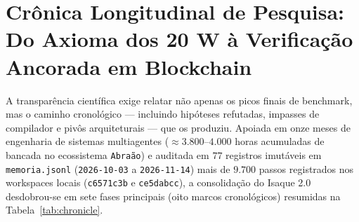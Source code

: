 \documentclass[10pt,a4paper]{article}
\begin{document}
\section{Cr\^onica Longitudinal de Pesquisa: Do Axioma dos 20 W \`a Verifica\c{c}\~ao Ancorada em Blockchain}

A transpar\^encia cient\'ifica exige relatar n\~ao apenas os picos finais de benchmark, mas o caminho cronol\'ogico --- incluindo hip\'oteses refutadas, impasses de compilador e piv\^os arquiteturais --- que os produziu. Apoiada em onze meses de engenharia de sistemas multiagentes ($\approx 3.800\text{--}4.000$ horas acumuladas de bancada no ecossistema \texttt{Abra\~ao}) e auditada em $77$ registros imut\'aveis em \texttt{memoria.jsonl} (\texttt{2026-10-03} a \texttt{2026-11-14}) mais de $9.700$ passos registrados nos workspaces locais (\texttt{c6571c3b} e \texttt{ce5dabcc}), a consolida\c{c}\~ao do Isaque 2.0 desdobrou-se em sete fases principais (oito marcos cronol\'ogicos) resumidas na Tabela~\ref{tab:chronicle}.
\end{document}
